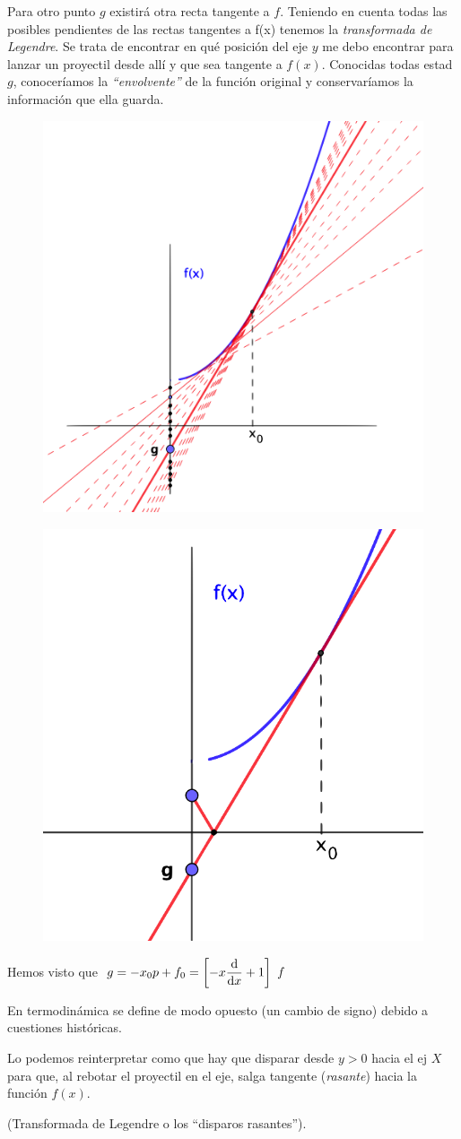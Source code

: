 \begin{multicols}{2}
Para otro punto $g$ existirá otra recta tangente a $f$. Teniendo en cuenta todas las posibles pendientes de las rectas tangentes a f(x) tenemos la \emph{transformada de Legendre}. Se trata de encontrar en qué posición del eje $y$ me debo encontrar para lanzar un proyectil desde allí y que sea tangente a $f(x)$. Conocidas todas estad $g$, conoceríamos la \emph{``envolvente''} de la función original y conservaríamos la información que ella guarda.

\begin{figure}[H]
	\centering
	\includegraphics[width=.4\textwidth]{imagenes/img11-02.png}
\end{figure}
\end{multicols}


\begin{multicols}{2}
\begin{figure}[H]
	\centering
	\includegraphics[width=.4\textwidth]{imagenes/img11-03.png}
\end{figure}	
Hemos visto que $\ g=-x_0p+f_0 = \left[ \displaystyle -x\dv{x} +1 \right]\ f$

En termodinámica se define de modo opuesto (un cambio de signo) debido a cuestiones históricas.

Lo podemos reinterpretar como que hay que disparar desde $y>0$ hacia el ej $X$ para que, al rebotar el proyectil en el eje, salga tangente (\emph{rasante}) hacia la función $f(x)$.

\begin{small}\textcolor{gris}{(Transformada de Legendre o los ``disparos rasantes'').}\end{small}

\end{multicols}

